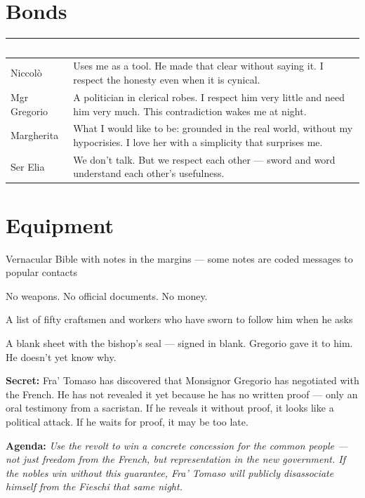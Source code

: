 \section*{Bonds}
\begin{table}[h]\centering\renewcommand{\arraystretch}{1.4}
\begin{tabularx}{\linewidth}{@{}L{2.6cm} X@{}}
\toprule{}
\textcolor{white}{\textbf{PC}} & \textcolor{white}{\textbf{Bond}} \\
\midrule
Niccol\`o & Uses me as a tool. He made that clear without saying it. I respect the honesty even when it is cynical. \\
Mgr Gregorio & A politician in clerical robes. I respect him very little and need him very much. This contradiction wakes me at night. \\
Margherita & What I would like to be: grounded in the real world, without my hypocrisies. I love her with a simplicity that surprises me. \\
Ser Elia & We don't talk. But we respect each other --- sword and word understand each other's usefulness. \\
\bottomrule
\end{tabularx}
\end{table}

\section*{Equipment}
\begin{goldlist}
\item Vernacular Bible with notes in the margins --- some notes are coded messages to popular contacts
\item No weapons. No official documents. No money.
\item A list of fifty craftsmen and workers who have sworn to follow him when he asks
\item A blank sheet with the bishop's seal --- signed in blank. Gregorio gave it to him. He doesn't yet know why.
\end{goldlist}

\clearpage
\begin{secretbox}
\textbf{Secret:} Fra' Tomaso has discovered that Monsignor Gregorio has negotiated
with the French. He has not revealed it yet because he has no written proof ---
only an oral testimony from a sacristan. If he reveals it without proof, it looks
like a political attack. If he waits for proof, it may be too late.

\medskip\noindent\textcolor{SecretRed}{\textbf{Agenda:}} \textit{Use the revolt to
win a concrete concession for the common people --- not just freedom from the French,
but representation in the new government. If the nobles win without this guarantee,
Fra' Tomaso will publicly disassociate himself from the Fieschi that same night.}
\end{secretbox}

